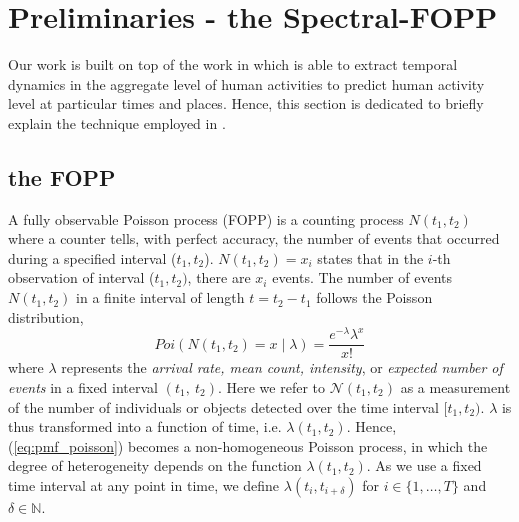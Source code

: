 \section{Preliminaries - the Spectral-FOPP}
\label{sec:preliminaries}

Our work is built on top of the work in \cite{jovan_iros16} which is able to extract temporal dynamics in the aggregate level of human activities to predict human activity level at particular times and places. Hence, this section is dedicated to briefly explain the technique employed in \cite{jovan_iros16}.

\subsection{the FOPP}

A fully observable Poisson process (FOPP) is a counting process $N(t_1, t_2)$ where a counter tells, with perfect accuracy, the number of events that occurred during a specified interval ($t_1,t_2$). $N(t_1,t_2) = x_i$ states that in the $i$-th observation of interval ($t_1, t_2)$, there are $x_i$ events. The number of events $N(t_1, t_2)$ in a finite interval of length $t = t_2 - t_1$ follows the Poisson distribution, 
\begin{equation}
    \label{eq:pmf_poisson}
	Poi(N(t_1, t_2) = x \mid \lambda) = \frac{e ^{-\lambda} \lambda ^{x}}{x!}
\end{equation}
\noindent where $\lambda$ represents the {\em arrival rate, mean count, intensity}, or {\em expected number of events} in a fixed interval $(t_1,~ t_2)$. Here we refer to $\mathcal{N}(t_1, t_2)$ as a measurement of the number of individuals or objects detected over the time interval $[t_1, t_2)$. $\lambda$ is thus transformed into a function of time, i.e. $\lambda(t_1, t_2)$. Hence, (\ref{eq:pmf_poisson}) becomes a non-homogeneous Poisson process, in which the degree of heterogeneity depends on the function $\lambda(t_1, t_2)$. As we use a fixed time interval at any point in time, we define $\lambda(t_i, t_{i+\delta})$ for $i \in \{1,\ldots,T\}$ and $\delta \in \mathbb{N}$.

